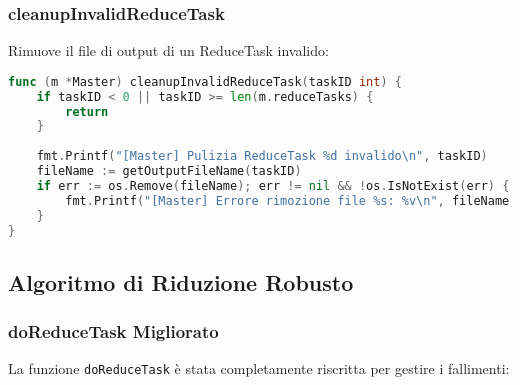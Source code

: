 \documentclass[12pt,a4paper]{article}
\begin{document}
\subsubsection{cleanupInvalidReduceTask}

Rimuove il file di output di un ReduceTask invalido:

\begin{lstlisting}[language=go]
func (m *Master) cleanupInvalidReduceTask(taskID int) {
    if taskID < 0 || taskID >= len(m.reduceTasks) {
        return
    }
    
    fmt.Printf("[Master] Pulizia ReduceTask %d invalido\n", taskID)
    fileName := getOutputFileName(taskID)
    if err := os.Remove(fileName); err != nil && !os.IsNotExist(err) {
        fmt.Printf("[Master] Errore rimozione file %s: %v\n", fileName, err)
    }
}
\end{lstlisting}

\subsection{Algoritmo di Riduzione Robusto}

\subsubsection{doReduceTask Migliorato}

La funzione \texttt{doReduceTask} è stata completamente riscritta per gestire i fallimenti:
\end{document}
